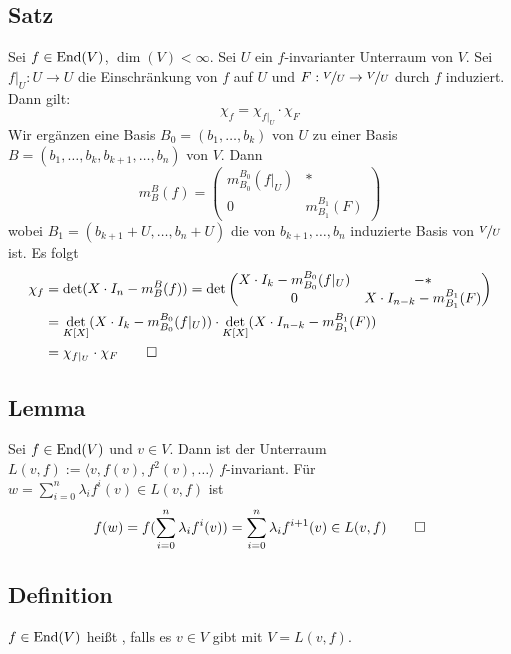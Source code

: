 \subsection[Satz über Zerlegung des charakteristischen Polynoms mit Hilfe von Unterräumen]{Satz} %
\label{sub:611}
Sei $f \in \operatorname{End}(V)$, $\dim (V)< \infty$. Sei $U$ ein $f$-invarianter Unterraum von $V$. Sei $f|_{U} : U \to U$ die Einschränkung von $f$ auf $U$ und 
$F: \nicefrac{V}{U} \to \nicefrac{V}{U}$ durch $f$ induziert. Dann gilt:
\[
	\chi_f = \chi_{f|_U} \cdot  \chi_F
\]
Wir ergänzen eine Basis $B_0 = (b_1, \ldots , b_k)$ von $U$ zu einer Basis $B=(b_1, \ldots , b_k, b_{k+1}, \ldots , b_n)$ von $V$. Dann 
\[
	m_B^B(f) = \begin{pmatrix}
		m_{B_0}^{B_0}(f|_U) & * \\
		0 & m_{B_1}^{B_1}(F)
	\end{pmatrix}
\]
wobei $B_1 = (b_{k+1} + U , \ldots , b_n + U)$ die von $b_{k+1}, \ldots , b_n$ induzierte Basis von $\nicefrac{V}{U}$ ist. Es folgt
\begin{align*}
	\chi_f &= \det (X \cdot  I_n - m_{B}^{B}(f)) = \det {\begin{pmatrix}
		X \cdot  I_k - m_{B_0}^{B_0}(f|_{U}) &  -* \\
		0 & X \cdot I_{n-k} - m_{B_1}^{B_1}(F)
	\end{pmatrix}} \\
	&= \det_{K[X]} (X \cdot  I_k - m_{B_0}^{B_0} (f|_U)) \cdot \det_{K[X]} (X \cdot  I_{n-k} - m_{B_1}^{B_1} (F)) \\
	&= \chi_{f|_U} \cdot  \chi_{F} \tag*{$\square$} 
\end{align*}

\subsection[Lemma: $L(v,f)$ ist invariant]{Lemma} %
\label{sub:612}
Sei $f \in \operatorname{End}(V)$ und $v \in V$. Dann ist der Unterraum $L(v,f) := \langle v, f(v), f^2 (v), \ldots \rangle$ $f$-invariant.
Für $w= \sum_{i=0}^{n} \lambda_i f^i (v) \in L(v,f)$ ist 
\[
	f(w) = f (\sum_{i=0}^{n} \lambda_i f^i (v)) = \sum_{i=0}^{n} \lambda_i f^{i+1}(v) \in L(v,f) \tag*{$\square$}
\] 

\subsection[Definition: zyklischer Endomorphismus]{Definition} %
\label{sub:613}
$f \in \operatorname{End}(V)$ heißt , falls es $v \in V$ gibt mit $V=L(v,f)$. 

